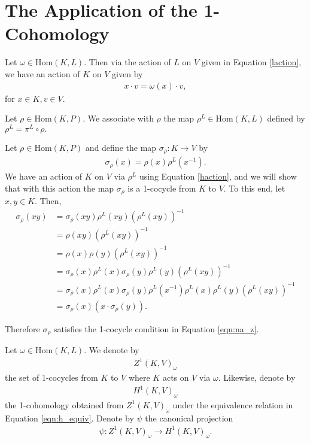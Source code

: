 \section{The Application of the 1-Cohomology}
Let $\omega \in \mathrm{Hom}(K, L)$. Then via the action of $L$ on $V$ given in Equation \ref{laction}, we have an action of $K$ on $V$ given by
\begin{align} \label{haction} x \cdot v = \omega(x) \cdot v, \end{align}
for $x \in K, v \in V$.

\begin{definition} Let $\rho \in \mathrm{Hom}(K, P)$. We associate with $\rho$ the map $\rho^L \in \mathrm{Hom}(K, L)$ defined by
$\rho^L = \pi^L \circ \rho.$
\end{definition}

Let $\rho \in \mathrm{Hom}(K, P)$ and define the map $\sigma_\rho: K \rightarrow V$ by
\begin{align}\label{rho:alpha}
\sigma_\rho(x) = \rho(x)\rho^L(x^{-1}).
\end{align}
We have an action of $K$ on $V$ via $\rho^L$ using Equation \ref{haction}, and we will show that with this action the map $\sigma_\rho$ is a 1-cocycle from $K$ to $V$. To this end, let $x, y \in K$.
Then,
\begin{align*} \sigma_\rho(xy) &= \sigma_\rho(xy) \rho^L(xy) \left(\rho^L(xy)\right)^{-1} \\
	&= \rho(xy) \left(\rho^L(xy)\right)^{-1} \\
	&= \rho(x) \rho(y) \left(\rho^L(xy)\right)^{-1} \\
	&= \sigma_\rho(x) \rho^L(x) \sigma_\rho(y) \rho^L(y) \left(\rho^L(xy)\right)^{-1} \\
	&= \sigma_\rho(x) \rho^L(x) \sigma_\rho(y) \rho^L(x^{-1}) \rho^L(x) \rho^L(y) \left(\rho^L(xy)\right)^{-1} \\
	&= \sigma_\rho(x) \left(x \cdot \sigma_\rho(y)\right). 
\end{align*}

Therefore $\sigma_\rho$ satisfies the 1-cocycle condition in Equation \ref{eqn:na_z}.

\begin{definition}\label{h1sigma} Let $\omega \in \mathrm{Hom}(K, L)$. We denote by
\begin{align*} Z^1(K, V)_\omega \end{align*}
the set of 1-cocycles from $K$ to $V$ where $K$ acts on $V$ via $\omega$.
Likewise, denote by
\begin{align*} H^1(K, V)_\omega \end{align*}
the 1-cohomology obtained from $Z^1(K, V)_\omega$ under the equivalence relation in Equation \ref{eqn:h_equiv}. Denote by $\psi$ the canonical projection
\begin{align*} \psi : Z^1(K, V)_\omega \rightarrow H^1(K, V)_\omega. \end{align*}
\end{definition} 

